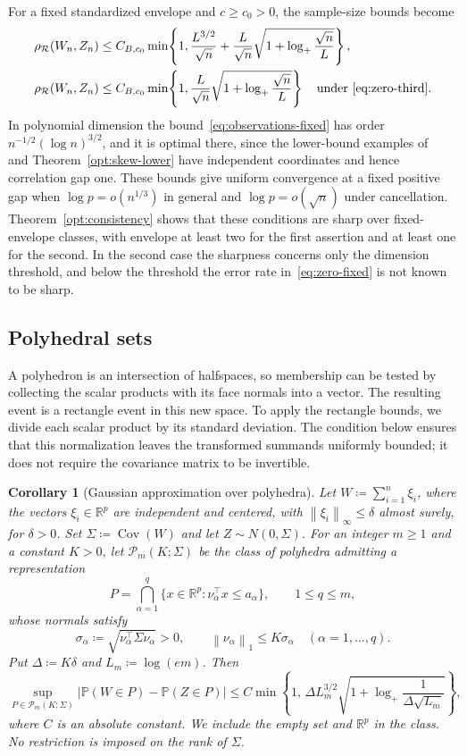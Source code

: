 \documentclass[11pt,letterpaper]{article}
\newtheorem{corollary}{Corollary}
\theoremstyle{remark}
\newcommand{\Pp}{\mathbb P}
\newcommand{\R}{\mathbb R}
\newcommand{\Cov}{\operatorname{Cov}}
\newcommand{\norm}[1]{\left\lVert#1\right\rVert}
\newcommand{\rh}{\rho_{\mathcal R}}
\begin{document}
For a fixed standardized envelope and \(c\ge c_0>0\), the sample-size
bounds become
\begin{align}
 \rh(W_n,Z_n)&\le C_{B,c_0}\min\!\left\{1,
 \frac{L^{3/2}}{\sqrt n}
 +\frac L{\sqrt n}\sqrt{1+\log_+\frac{\sqrt n}{L}}\right\},
 \label{eq:observations-fixed}\\
 \rh(W_n,Z_n)&\le C_{B,c_0}\min\!\left\{1,
 \frac L{\sqrt n}\sqrt{1+\log_+\frac{\sqrt n}{L}}\right\}
 \quad\text{under~\eqref{eq:zero-third}}.
 \label{eq:zero-fixed}
\end{align}
In polynomial dimension the bound~\eqref{eq:observations-fixed}
has order \(n^{-1/2}(\log n)^{3/2}\), and it is optimal there, since the
lower-bound examples of~\cite[Proposition~2.1]{CCK} and
Theorem~\ref{opt:skew-lower} have independent coordinates and hence
correlation gap one. These bounds give uniform convergence at a fixed
positive gap when \(\log p=o(n^{1/3})\) in general and \(\log p=o(\sqrt n)\)
under cancellation. Theorem~\ref{opt:consistency} shows that these
conditions are sharp over fixed-envelope classes, with envelope at least
two for the first assertion and at least one for the second. In
the second case the sharpness concerns only the dimension threshold, and
below the threshold the error rate in~\eqref{eq:zero-fixed} is not known
to be sharp.

\subsection{Polyhedral sets}\label{sec:polyhedra}
A polyhedron is an intersection of halfspaces, so membership can be
tested by collecting the scalar products with its face normals into
a vector. The resulting event is a rectangle event in this new space.
To apply the rectangle bounds, we divide each scalar product by its
standard deviation. The condition below ensures that this normalization
leaves the transformed summands uniformly bounded; it does not require
the covariance matrix to be invertible.

\begin{corollary}[Gaussian approximation over polyhedra]\label{cor:polyhedra}
Let \(W\coloneqq\sum_{i=1}^n\xi_i\), where the vectors
\(\xi_i\in\R^p\) are independent and centered, with
\(\norm{\xi_i}_\infty\le\delta\) almost surely, for \(\delta>0\).
Set \(\Sigma\coloneqq\Cov(W)\) and let \(Z\sim N(0,\Sigma)\).
For an integer \(m\ge1\) and a constant \(K>0\), let
\(\mathcal P_m(K;\Sigma)\) be the class of polyhedra admitting a
representation
\[
 P=\bigcap_{\alpha=1}^q
 \{x\in\R^p:\nu_\alpha^\top x\le a_\alpha\},
 \qquad 1\le q\le m,
\]
whose normals satisfy
\[
 \sigma_\alpha\coloneqq
 \sqrt{\nu_\alpha^\top\Sigma\nu_\alpha}>0,
 \qquad \norm{\nu_\alpha}_1\le K\sigma_\alpha
 \quad(\alpha=1,\ldots,q).
\]
Put \(\Delta\coloneqq K\delta\) and \(L_m\coloneqq\log(em)\).
Then
\[
 \sup_{P\in\mathcal P_m(K;\Sigma)}
 |\Pp(W\in P)-\Pp(Z\in P)|
 \le C\min\!\left\{1,\,
 \Delta L_m^{3/2}
 \sqrt{1+\log_+\frac1{\Delta\sqrt{L_m}}}\right\},
\]
where \(C\) is an absolute constant. We include the empty set and
\(\R^p\) in the class. No restriction is imposed on the
rank of \(\Sigma\).
\end{corollary}
\end{document}
